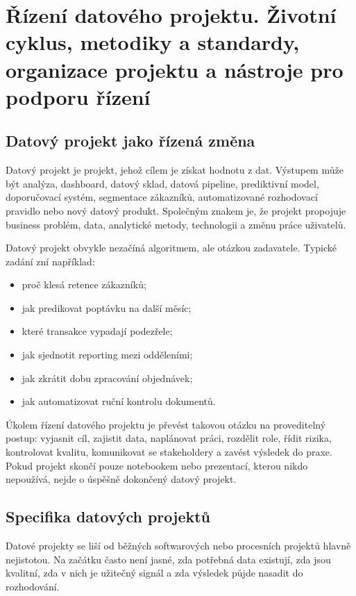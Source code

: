 \section{Řízení datového projektu. Životní cyklus, metodiky a standardy, organizace projektu a nástroje pro podporu řízení}

\subsection{Datový projekt jako řízená změna}
Datový projekt je projekt, jehož cílem je získat hodnotu z dat. Výstupem může být analýza, dashboard, datový sklad, datová pipeline, prediktivní model, doporučovací systém, segmentace zákazníků, automatizované rozhodovací pravidlo nebo nový datový produkt. Společným znakem je, že projekt propojuje business problém, data, analytické metody, technologii a změnu práce uživatelů.

Datový projekt obvykle nezačíná algoritmem, ale otázkou zadavatele. Typické zadání zní například:
\begin{itemize}
  \item proč klesá retence zákazníků;
  \item jak predikovat poptávku na další měsíc;
  \item které transakce vypadají podezřele;
  \item jak sjednotit reporting mezi odděleními;
  \item jak zkrátit dobu zpracování objednávek;
  \item jak automatizovat ruční kontrolu dokumentů.
\end{itemize}

Úkolem řízení datového projektu je převést takovou otázku na proveditelný postup: vyjasnit cíl, zajistit data, naplánovat práci, rozdělit role, řídit rizika, kontrolovat kvalitu, komunikovat se stakeholdery a zavést výsledek do praxe. Pokud projekt skončí pouze notebookem nebo prezentací, kterou nikdo nepoužívá, nejde o úspěšně dokončený datový projekt.

\subsection{Specifika datových projektů}
Datové projekty se liší od běžných softwarových nebo procesních projektů hlavně nejistotou. Na začátku často není jasné, zda potřebná data existují, zda jsou kvalitní, zda v nich je užitečný signál a zda výsledek půjde nasadit do rozhodování.

